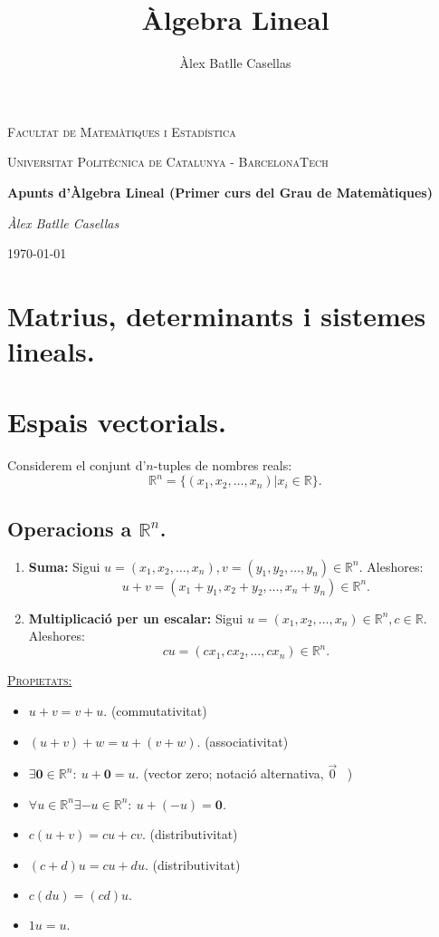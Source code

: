 \documentclass[11pt]{article}
\title{Àlgebra Lineal}
\author{Àlex Batlle Casellas}
\begin{document}
\begin{titlepage}
	\centering
	{\scshape\LARGE Facultat de Matemàtiques i Estadística \par}
	\vspace{1cm}
	{\scshape\Large Universitat Politècnica de Catalunya - BarcelonaTech\par}
	\vspace{1.5cm}
	{\huge\bfseries Apunts d'Àlgebra Lineal (Primer curs del Grau de Matemàtiques)
	\par}
	\vspace{2cm}
	{\Large\itshape Àlex Batlle Casellas\par}

	\vfill

	{\large \today\par}
\end{titlepage}


\vfill
\newpage

\tableofcontents
\newpage
\section{Matrius, determinants i sistemes lineals.}
\section{Espais vectorials.}
Considerem el conjunt d'$n$-tuples de nombres reals:
$$\mathbb{R}^n=\{(x_1,x_2,\ldots,x_n)|x_i\in\mathbb{R}\}.$$
\subsection{Operacions a $\mathbb{R}^n$.}
\begin{enumerate}
	\item \textbf{Suma:} Sigui $u=(x_1,x_2,\ldots,x_n),v=(y_1,y_2,\ldots,y_n)\in\mathbb{R}^n$. Aleshores:
	$$u+v=(x_1+y_1,x_2+y_2,\ldots,x_n+y_n)\in\mathbb{R}^n.$$
	\item \textbf{Multiplicació per un escalar:} Sigui $u=(x_1,x_2,\ldots,x_n)\in\mathbb{R}^n,c\in\mathbb{R}$. Aleshores:
	$$cu=(cx_1,cx_2,\ldots,cx_n)\in\mathbb{R}^n.$$
\end{enumerate}
\underline{{\scshape Propietats:}}
\begin{itemize}
	\item $u+v=v+u.$ (commutativitat)
	\item $(u+v)+w=u+(v+w).$ (associativitat)
	\item $\exists\textbf{0}\in\mathbb{R}^n: \ u+\textbf{0}=u.$ (vector zero; notació alternativa, $\vec{0}$ \ )
	\item $\forall u\in\mathbb{R}^n\exists -u\in\mathbb{R}^n: \ u + (-u) = \textbf{0}.$
	\item $c(u+v)=cu+cv.$ (distributivitat)
	\item $(c+d)u=cu+du.$ (distributivitat)
	\item $c(du)=(cd)u.$
	\item $1u=u.$
\end{itemize}
\end{document}
